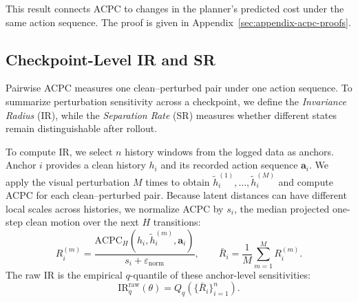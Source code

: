 \documentclass{article}
\begin{document}
This result connects ACPC to changes in the planner's predicted cost under
the same action sequence. The proof is given in
Appendix~\ref{sec:appendix-acpc-proofs}.

\subsection{Checkpoint-Level IR and SR}
\label{sec:acpc-ir-sr}

Pairwise ACPC measures one clean--perturbed pair under one action sequence.
To summarize perturbation sensitivity across a checkpoint, we define the
\emph{Invariance Radius} (IR), while the \emph{Separation Rate} (SR) measures
whether different states remain distinguishable after rollout.

To compute IR, we select $n$ history windows from the logged data as anchors.
Anchor $i$ provides a clean history $h_i$ and its recorded action sequence
$\mathbf a_i$. We apply the visual perturbation $M$ times to obtain
$\tilde h_i^{(1)},\ldots,\tilde h_i^{(M)}$ and compute ACPC for each
clean--perturbed pair. Because latent distances can have different local
scales across histories, we normalize ACPC by $s_i$, the median projected
one-step clean motion over the next $H$ transitions:
\begin{equation}
R_i^{(m)}
=
\frac{
\mathrm{ACPC}_H(h_i,\tilde h_i^{(m)},\mathbf a_i)
}{
s_i+\varepsilon_{\mathrm{norm}}
},
\qquad
\bar R_i=\frac{1}{M}\sum_{m=1}^{M}R_i^{(m)}.
\label{eq:normalized-same-state-radius}
\end{equation}
The raw IR is the empirical $q$-quantile of these anchor-level sensitivities:
\begin{equation}
\mathrm{IR}^{\mathrm{raw}}_q(\theta)
=
Q_q\!\left(\{\bar R_i\}_{i=1}^{n}\right).
\label{eq:ir-raw}
\end{equation}
\end{document}
